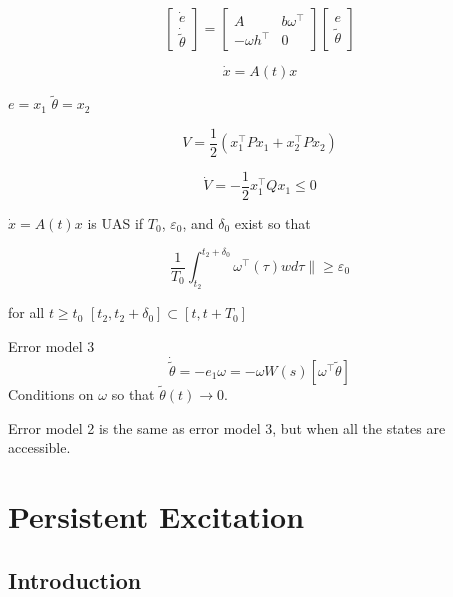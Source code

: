 \begin{equation*}
  \begin{bmatrix}
    \dot{e} \\ \dot{\tilde{\theta}}
  \end{bmatrix}
  =
  \begin{bmatrix}
    A & b\omega^{\top} \\
    -\omega h^{\top} & 0
  \end{bmatrix}
  \begin{bmatrix}
    e \\ \tilde{\theta}
  \end{bmatrix}
\end{equation*}

\begin{equation*}
  \dot{x}=A(t)x
\end{equation*}

$e=x_{1}$
$\tilde{\theta}=x_{2}$

\begin{equation*}
  V=\frac{1}{2}(x_{1}^{\top}Px_{1}+x_{2}^{\top}Px_{2})
\end{equation*}

\begin{equation*}
  \dot{V}=-\frac{1}{2}x_{1}^{\top}Qx_{1}\leq0
\end{equation*}

$\dot{x}=A(t)x$ is UAS if $T_{0}$, $\varepsilon_{0}$, and $\delta_{0}$ exist so that

\begin{equation*}
  \frac{1}{T_{0}}\int_{t_{2}}^{t_{2}+\delta_{0}}\omega^{\top}(\tau)wd\tau\|\geq\varepsilon_{0}
\end{equation*}

for all $t\geq t_{0}$ $[t_{2},t_{2}+\delta_{0}]\subset[t,t+T_{0}]$

Error model 3
\begin{equation*}
  \dot{\tilde{\theta}}=-e_{1}\omega=-\omega W(s)[\omega^{\top}\tilde{\theta}]
\end{equation*}
Conditions on $\omega$ so that $\tilde{\theta}(t)\rightarrow0$.

Error model 2 is the same as error model 3, but when all the states are accessible.

\section{Persistent Excitation}

\subsection{Introduction}


